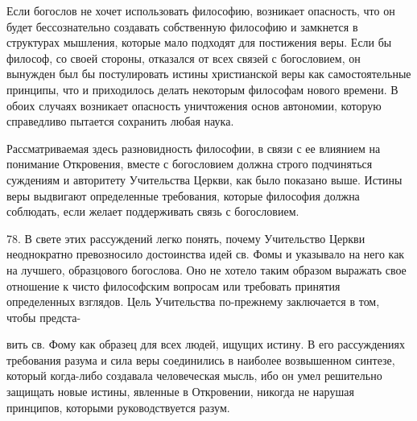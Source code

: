 \documentclass[a5paper,10pt]{article}
\begin{document}
Если богослов не хочет использовать философию, возникает опасность, что он
будет бессознательно создавать собственную философию и замкнется в структурах
мышления, которые мало подходят для постижения веры. Если бы философ, со своей
стороны, отказался от всех связей с богословием, он вынужден был бы
постулировать истины христианской веры как самостоятельные принципы, что и
приходилось делать некоторым философам нового времени. В обоих случаях
возникает опасность уничтожения основ автономии, которую справедливо пытается
сохранить любая наука.

Рассматриваемая здесь разновидность философии, в связи с ее влиянием на
понимание Откровения, вместе с богословием должна строго подчиняться суждениям
и авторитету Учительства Церкви, как было показано выше. Истины веры выдвигают
определенные требования, которые философия должна соблюдать, если желает
поддерживать связь с богословием.

78. В свете этих рассуждений легко понять, почему Учительство Церкви
неоднократно превозносило достоинства идей св. Фомы и указывало на него как на
лучшего, образцового богослова. Оно не хотело таким образом выражать свое
отношение к чисто философским вопросам или требовать принятия определенных
взглядов. Цель Учительства по-прежнему заключается в том, чтобы предста-

вить св. Фому как образец для всех людей, ищущих истину. В его рассуждениях
требования разума и сила веры соединились в наиболее возвышенном синтезе,
который когда-либо создавала человеческая мысль, ибо он умел решительно
защищать новые истины, явленные в Откровении, никогда не нарушая принципов,
которыми руководствуется разум.
\end{document}
